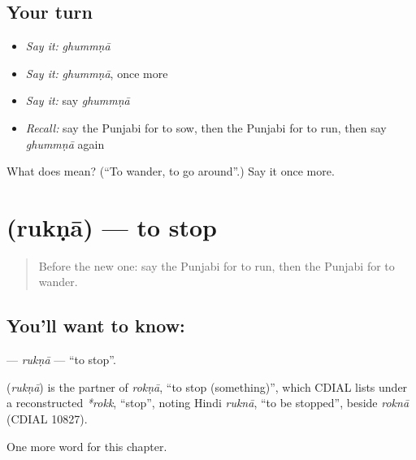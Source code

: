 \subsection*{Your turn}
\begin{itemize}
\raggedright
  \item \emph{Say it:} \emph{ghummṇā}
  \item \emph{Say it:} \emph{ghummṇā}, once more
  \item \emph{Say it:} say \emph{ghummṇā}
  \item \emph{Recall:} say the Punjabi for to sow, then the Punjabi for to run, then say \emph{ghummṇā} again
\end{itemize}

\begin{tcolorbox}[breakable,colback=teal!4,colframe=teal!35!black,title={Before you move on}]
What does  mean? (\textquotedblleft{}To wander, to go around\textquotedblright{}.) Say it once more.
\end{tcolorbox}
\section[\texorpdfstring{\pa{ਰੁਕਣਾ} (rukṇā)}{ਰੁਕਣਾ (rukṇā)}]{ (rukṇā) — to stop}

\label{lesson:PA-C152-rukna}



\begin{quote}
Before the new one: say the Punjabi for to run, then the Punjabi for to wander.
\end{quote}

\subsection*{You'll want to know: }
\textbf{} — \emph{rukṇā} — \textquotedblleft{}to stop\textquotedblright{}.

\begin{cousinweb}
\textbf{} (\emph{rukṇā}) is the partner of \emph{rokṇā}, \textquotedblleft{}to stop (something)\textquotedblright{}, which CDIAL lists under a reconstructed \emph{*rokk}, \textquotedblleft{}stop\textquotedblright{}, noting Hindi \emph{ruknā}, \textquotedblleft{}to be stopped\textquotedblright{}, beside \emph{roknā} (CDIAL 10827).
\end{cousinweb}

\begin{grammarlens}[title={What you've built}]
One more word for this chapter.
\end{grammarlens}

